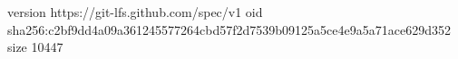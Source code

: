 version https://git-lfs.github.com/spec/v1
oid sha256:c2bf9dd4a09a361245577264cbd57f2d7539b09125a5ce4e9a5a71ace629d352
size 10447
